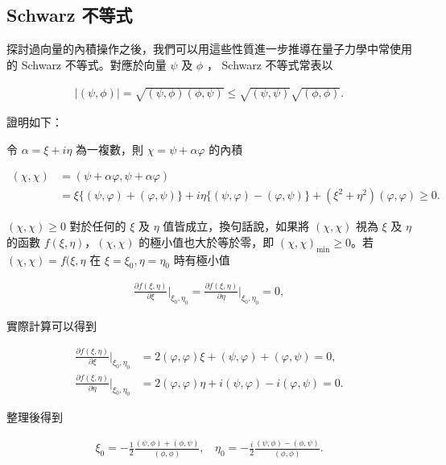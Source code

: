 \subsection{Schwarz 不等式}


探討過向量的內積操作之後，我們可以用這些性質進一步推導在量子力學中常使用的 Schwarz 不等式。對應於向量 $\psi$ 及 $\phi$ ， Schwarz 不等式常表以

\begin{align}
|(\psi,\phi)|=\sqrt{(\psi,\phi)(\phi,\psi)}\leqslant\sqrt{(\psi,\psi)}\sqrt{(\phi,\phi)}.
\end{align}

證明如下：

令 $ \alpha =\xi+i\eta $ 為一複數，則 $\chi=\psi+\alpha\varphi$ 的內積

\begin{align*}
(\chi, \chi)&=(\psi+\alpha\varphi, \psi+\alpha\varphi)\\
&=\xi\{(\psi, \varphi)+(\varphi, \psi)\}+i\eta\{(\psi, \varphi)-(\varphi, \psi)\}+(\xi^2+\eta^2)(\varphi, \varphi)\geqslant 0.
\end{align*}

$(\chi, \chi)\geqslant 0$ 對於任何的 $\xi$ 及 $\eta$ 值皆成立，換句話說，如果將 $(\chi, \chi)$ 視為 $\xi$ 及 $\eta$ 的函數 $f(\xi, \eta)$，$(\chi, \chi)$ 的極小值也大於等於零，即 $(\chi, \chi)_{\mbox{min}}\geqslant 0$。若 $(\chi, \chi)=f(\xi, \eta$ 在 $\xi=\xi_0, \eta=\eta_0$ 時有極小值


\begin{align}
\frac{\partial f(\xi, \eta)}{\partial \xi}\Bigg|_{\xi_0,\eta_0}=\frac{\partial f(\xi, \eta)}{\partial \eta}\Bigg|_{\xi_0,\eta_0}=0,
\end{align}

實際計算可以得到

\begin{align*}
\frac{\partial f(\xi, \eta)}{\partial \xi}\Bigg|_{\xi_0,\eta_0}&=2(\varphi, \varphi)\xi+(\psi, \varphi)+(\varphi, \psi)=0,\\
\frac{\partial f(\xi, \eta)}{\partial \eta}\Bigg|_{\xi_0,\eta_0}&=2(\varphi, \varphi)\eta+i(\psi, \varphi)-i(\varphi, \psi)=0.
\end{align*}

整理後得到

\begin{align}
\xi_0=-\frac{1}{2}\frac{(\psi,\phi)+(\phi,\psi)}{(\phi,\phi)},~~~~
\eta_0=-\frac{i}{2}\frac{(\psi,\phi)-(\phi,\psi)}{(\phi,\phi)}.
\end{align}

